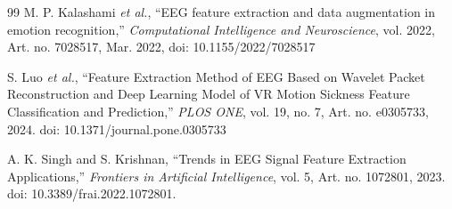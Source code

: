\documentclass[12pt, a4paper]{report}
\begin{document}
\begin{thebibliography}{99}
M. P. Kalashami \textit{et al.}, ``EEG feature extraction and data augmentation in emotion recognition,'' \textit{Computational Intelligence and Neuroscience}, vol. 2022, Art. no. 7028517, Mar. 2022, doi: 10.1155/2022/7028517
        
S. Luo \textit{et al.}, ``Feature Extraction Method of EEG Based on Wavelet Packet Reconstruction and Deep Learning Model of VR Motion Sickness Feature Classification and Prediction,'' \textit{PLOS ONE}, vol. 19, no. 7, Art. no. e0305733, 2024. doi: 10.1371/journal.pone.0305733
        
A. K. Singh and S. Krishnan, ``Trends in EEG Signal Feature Extraction Applications,'' \textit{Frontiers in Artificial Intelligence}, vol. 5, Art. no. 1072801, 2023. doi: 10.3389/frai.2022.1072801.

\end{thebibliography}
\end{document}
